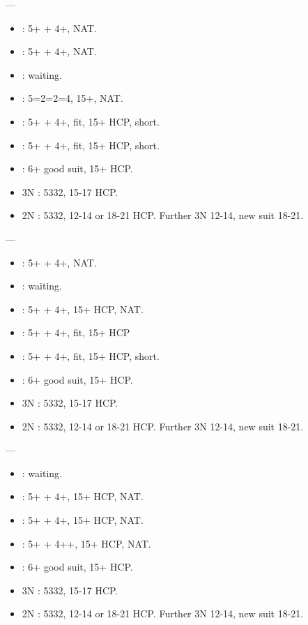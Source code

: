 \documentclass[12pt,twoside,a5paper]{report}%
\begin{document}
	----
	\begin{itemize}
	\renewcommand{\labelitemi}{}
	\item {} : 5+\sp{} + 4+\di{}, NAT.
	\item {} : 5+\sp{} + 4+\he{}, NAT.
	\item {} : waiting.
	\item {} : 5=2=2=4, 15+, NAT.
	\item {} : 5+\sp{} + 4+\cl{}, fit, 15+ HCP, short\di{}.
	\item {} : 5+\sp{} + 4+\cl{}, fit, 15+ HCP, short\he{}.
	\item {} : 6+\sp{} good suit, 15+ HCP.
	\item 3N : 5332, 15-17 HCP.
	\item 2N : 5332, 12-14 or 18-21 HCP. Further 3N 12-14, new suit 18-21.
	\end{itemize}

	----
	\begin{itemize}
	\renewcommand{\labelitemi}{}
	\item {} : 5+\sp{} + 4+\he{}, NAT.
	\item {} : waiting.
	\item {} : 5+\he{} + 4+\cl{}, 15+ HCP, NAT.
	\item {} : 5+\sp{} + 4+\di{}, fit, 15+ HCP
	\item {} : 5+\sp{} + 4+\di{}, fit, 15+ HCP, short\he{}.
	\item {} : 6+\sp{} good suit, 15+ HCP.
	\item 3N : 5332, 15-17 HCP.
	\item 2N : 5332, 12-14 or 18-21 HCP. Further 3N 12-14, new suit 18-21.
	\end{itemize}

	----
	\begin{itemize}
	\renewcommand{\labelitemi}{}
	\item {} : waiting.
	\item {} : 5+\he{} + 4+\cl{}, 15+ HCP, NAT.
	\item {} : 5+\sp{} + 4+\di{}, 15+ HCP, NAT.
	\item {} : 5+\sp{} + 4+\he{}+, 15+ HCP, NAT.
	\item {} : 6+\sp{} good suit, 15+ HCP.
	\item 3N : 5332, 15-17 HCP.
	\item 2N : 5332, 12-14 or 18-21 HCP. Further 3N 12-14, new suit 18-21.
	\end{itemize}
\end{document}
